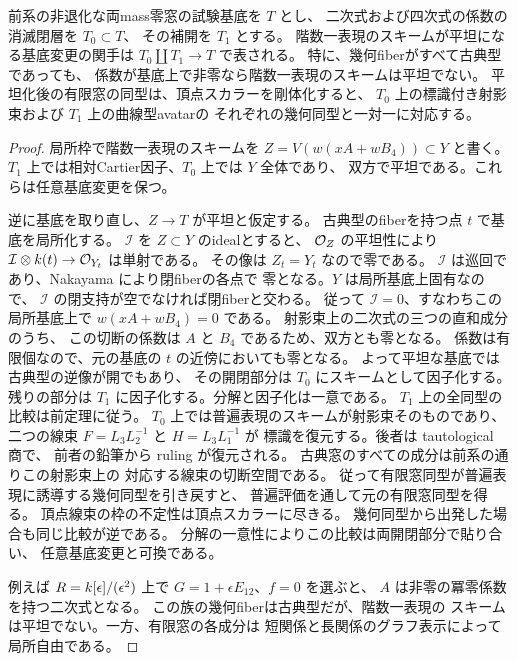 \begin{corollary}[曲線型と古典型の間の平坦化]
\label{cor:qa-avatar-deep-image-flattening}
前系の非退化な両mass零窓の試験基底を $T$ とし、
二次式および四次式の係数の消滅閉層を $T_0\subset T$、
その補開を $T_1$ とする。
階数一表現のスキームが平坦になる基底変更の関手は
$T_0\amalg T_1\to T$ で表される。
特に、幾何fiberがすべて古典型であっても、
係数が基底上で非零なら階数一表現のスキームは平坦でない。
平坦化後の有限窓の同型は、頂点スカラーを剛体化すると、
$T_0$ 上の標識付き射影束および $T_1$ 上の曲線型avatarの
それぞれの幾何同型と一対一に対応する。
\end{corollary}
\begin{proof}
局所枠で階数一表現のスキームを
$Z=V(w(xA+wB_4))\subset Y$ と書く。
$T_1$ 上では相対Cartier因子、$T_0$ 上では $Y$ 全体であり、
双方で平坦である。これらは任意基底変更を保つ。

逆に基底を取り直し、$Z\to T$ が平坦と仮定する。
古典型のfiberを持つ点 $t$ で基底を局所化する。
$\mathcal I$ を $Z\subset Y$ のidealとすると、
$\mathcal O_Z$ の平坦性により
$\mathcal I\otimes k(t)\to\mathcal O_{Y_t}$ は単射である。
その像は $Z_t=Y_t$ なので零である。
$\mathcal I$ は巡回であり、Nakayama により閉fiberの各点で
零となる。$Y$ は局所基底上固有なので、
$\mathcal I$ の閉支持が空でなければ閉fiberと交わる。
従って $\mathcal I=0$、すなわちこの局所基底上で
$w(xA+wB_4)=0$ である。
射影束上の二次式の三つの直和成分のうち、
この切断の係数は $A$ と $B_4$ であるため、双方とも零となる。
係数は有限個なので、元の基底の $t$ の近傍においても零となる。
よって平坦な基底では古典型の逆像が開でもあり、
その開閉部分は $T_0$ にスキームとして因子化する。
残りの部分は $T_1$ に因子化する。分解と因子化は一意である。
$T_1$ 上の全同型の比較は前定理に従う。
$T_0$ 上では普遍表現のスキームが射影束そのものであり、
二つの線束 $F=L_3L_2^{-1}$ と $H=L_3L_1^{-1}$ が
標識を復元する。後者は tautological 商で、
前者の鉛筆から ruling が復元される。
古典窓のすべての成分は前系の通りこの射影束上の
対応する線束の切断空間である。
従って有限窓同型が普遍表現に誘導する幾何同型を引き戻すと、
普遍評価を通して元の有限窓同型を得る。
頂点線束の枠の不定性は頂点スカラーに尽きる。
幾何同型から出発した場合も同じ比較が逆である。
分解の一意性によりこの比較は両開閉部分で貼り合い、
任意基底変更と可換である。

例えば $R=k[\epsilon]/(\epsilon^2)$ 上で
$G=1+\epsilon E_{12}$、$f=0$ を選ぶと、
$A$ は非零の冪零係数を持つ二次式となる。
この族の幾何fiberは古典型だが、階数一表現の
スキームは平坦でない。一方、有限窓の各成分は
短関係と長関係のグラフ表示によって局所自由である。
\end{proof}

